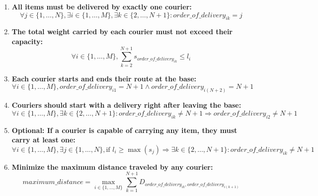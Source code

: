 \documentclass{article}
\begin{document}
\begin{enumerate}
    \item \textbf{All items must be delivered by exactly one courier:}
    \begin{equation}
        \forall j \in \{1, \dots, N\}, \exists i \in \{1, \dots, M\}, \exists k \in \{2, \dots, N+1\} : order\_of\_delivery_{ik} = j
    \end{equation}
    
    \item \textbf{The total weight carried by each courier must not exceed their capacity:}
    \begin{equation}
        \forall i \in \{1, \dots, M\}, \sum_{k=2}^{N+1} s_{order\_of\_delivery_{ik}} \leq l_i
    \end{equation}
    
    \item \textbf{Each courier starts and ends their route at the base:}
    \begin{equation}
        \forall i \in \{1, \dots, M\}, order\_of\_delivery_{i1} = N+1 \land order\_of\_delivery_{i(N+2)} = N+1
    \end{equation}
    
    \item \textbf{Couriers should start with a delivery right after leaving the base:}
    \begin{equation}
        \forall i \in \{1, \dots, M\}, \exists k \in \{2, \dots, N+1\} : order\_of\_delivery_{ik} \neq N+1 \Rightarrow order\_of\_delivery_{i2} \neq N+1
    \end{equation}
    
    \item \textbf{Optional: If a courier is capable of carrying any item, they must carry at least one:}
    \begin{equation}
        \forall i \in \{1, \dots, M\}, \exists j \in \{1, \dots, N\}, \text{if } l_i \geq \max(s_j) \Rightarrow \exists k \in \{2, \dots, N+1\} : order\_of\_delivery_{ik} \neq N+1
    \end{equation}
    
    \item \textbf{Minimize the maximum distance traveled by any courier:}
    \begin{equation}
        maximum\_distance = \max_{i \in \{1, \dots, M\}} \sum_{k=1}^{N+1} D_{order\_of\_delivery_{ik}, order\_of\_delivery_{i(k+1)}}
    \end{equation}
\end{enumerate}
\end{document}
